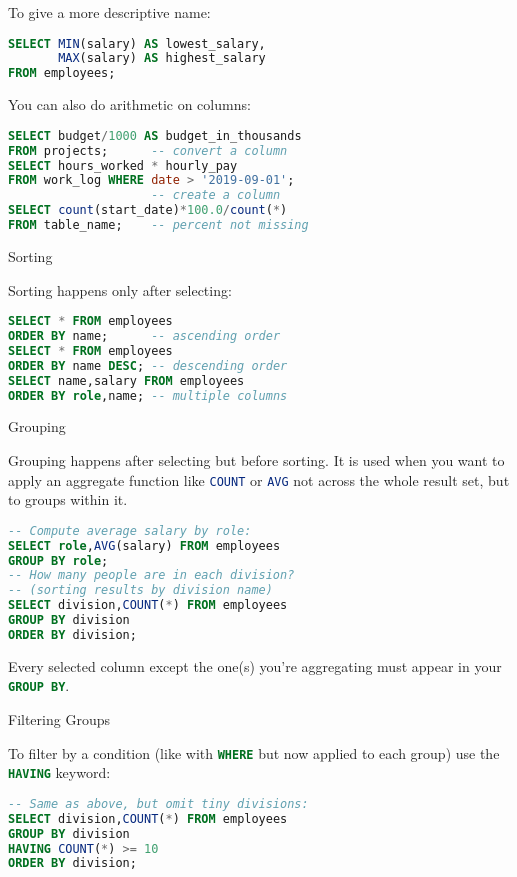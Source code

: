 \documentclass[a4paper,landscape,columns=3]{cheatsheet}
\def\sect#1{\begin{tcolorbox}[colback=blue!5!white,colframe=blue!75!black,size=title,leftrule=2mm]
    \large #1
\end{tcolorbox}}
\begin{document}
To give a more descriptive name:
\begin{lstlisting}[language=sql,frame=single,rulecolor=\color{gray}]
SELECT MIN(salary) AS lowest_salary,
       MAX(salary) AS highest_salary
FROM employees;
\end{lstlisting}

You can also do arithmetic on columns:
\begin{lstlisting}[language=sql,frame=single,rulecolor=\color{gray}]
SELECT budget/1000 AS budget_in_thousands
FROM projects;      -- convert a column
SELECT hours_worked * hourly_pay
FROM work_log WHERE date > '2019-09-01';
                    -- create a column
SELECT count(start_date)*100.0/count(*)
FROM table_name;    -- percent not missing
\end{lstlisting}

\sect{Sorting}

Sorting happens only after selecting:
\begin{lstlisting}[language=sql,frame=single,rulecolor=\color{gray}]
SELECT * FROM employees
ORDER BY name;      -- ascending order
SELECT * FROM employees
ORDER BY name DESC; -- descending order
SELECT name,salary FROM employees
ORDER BY role,name; -- multiple columns
\end{lstlisting}

\sect{Grouping}

Grouping happens after selecting but before sorting.  It is used when you want to apply an aggregate function like \lstinline[language=sql]{COUNT} or \lstinline[language=sql]{AVG} not across the whole result set, but to groups within it.
\begin{lstlisting}[language=sql,frame=single,rulecolor=\color{gray}]
-- Compute average salary by role:
SELECT role,AVG(salary) FROM employees
GROUP BY role;
-- How many people are in each division?
-- (sorting results by division name)
SELECT division,COUNT(*) FROM employees
GROUP BY division
ORDER BY division;
\end{lstlisting}
Every selected column except the one(s) you're aggregating must appear in your \lstinline[language=sql]{GROUP BY}.

\sect{Filtering Groups}

To filter by a condition (like with \lstinline[language=sql]{WHERE} but now applied to each group) use the \lstinline[language=sql]{HAVING} keyword:
\begin{lstlisting}[language=sql,frame=single,rulecolor=\color{gray}]
-- Same as above, but omit tiny divisions:
SELECT division,COUNT(*) FROM employees
GROUP BY division
HAVING COUNT(*) >= 10
ORDER BY division;
\end{lstlisting}
\end{document}
